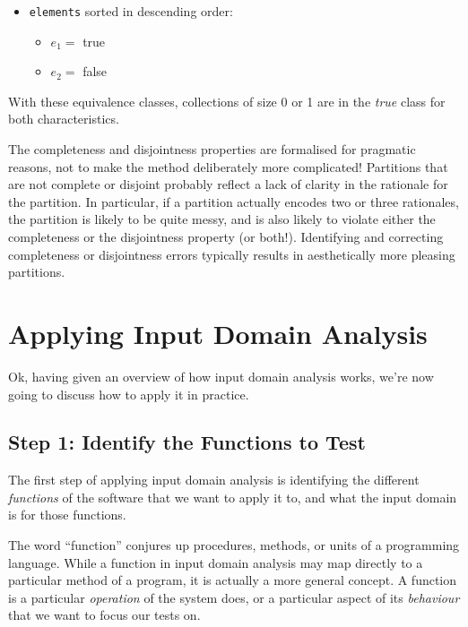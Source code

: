 \begin{itemize}
    \item {\tt elements} sorted in descending order:
    \begin{itemize}
        \item $e_1 =$ true
        \item $e_2 =$ false
    \end{itemize}
\end{itemize}

With these equivalence classes, collections of size 0 or 1 are in the {\it true}
class for both characteristics.

The completeness and disjointness properties are formalised for pragmatic
reasons, not to make the method deliberately more complicated!
%
Partitions that are not complete or disjoint probably reflect a lack of clarity
in the rationale for the partition. 
%
In particular, if a partition actually encodes two or three rationales, the
partition is likely to be quite messy, and is also likely to violate either the
completeness or the disjointness property (or both!). Identifying and correcting
completeness or disjointness errors typically results in aesthetically more
pleasing partitions. 
%
%

\section{Applying Input Domain Analysis}

Ok, having given an overview of how input domain analysis works, we're now
going to discuss how to apply it in practice. 

\subsection*{Step 1: Identify the Functions to Test}

The first step of applying input domain analysis is identifying the different
{\it functions} of the software that we want to apply it to, and what the input
domain is for those functions. 

The word ``function'' conjures up procedures, methods, or units of a programming
language. While a function in input domain analysis may map directly to a
particular method of a program, it is actually a more general concept. A
function is a particular {\it operation} of the system does, or a particular
aspect of its {\it behaviour} that we want to focus our tests on. 

